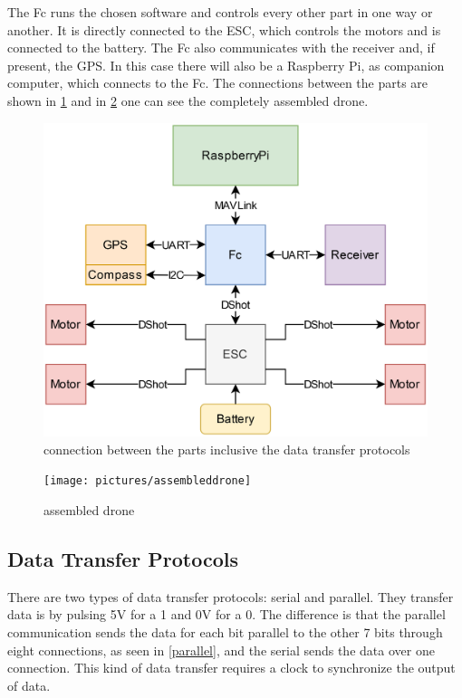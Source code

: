 \documentclass[svgnames]{article}
\begin{document}
	The \gls{Fc} runs the chosen software and controls every other part in one way or another. It is directly connected to the \gls{ESC}, which controls the motors and is connected to the battery. The \gls{Fc} also communicates with the receiver and, if present, the \gls{GPS}. In this case there will also be a Raspberry Pi, as companion computer, which connects to the \gls{Fc}. The connections between the parts are shown in \cref{fig:connectionscorrect2} and in \cref{fig:assembleddrone} one can see the completely assembled drone.
\begin{figure}[ht]
	\centering
	\includegraphics[width=0.7\linewidth]{pictures/connectionscorrect2}
	\caption{connection between the parts inclusive the data transfer protocols}
	\label{fig:connectionscorrect2}
\end{figure}

\begin{figure}[ht]
	\centering
	\texttt{[image: pictures/assembleddrone]}
	\caption{assembled drone}
	\label{fig:assembleddrone}
\end{figure}
	\subsection{Data Transfer Protocols}
	There are two types of data transfer protocols: serial and parallel. They transfer data is by pulsing 5V for a 1 and 0V for a 0. The difference is that the parallel communication sends the data for each bit parallel to the other 7 bits through eight connections, as seen in \cref{parallel}, and the serial sends the data over one connection. This kind of data transfer requires a clock to synchronize the output of data.
\end{document}

